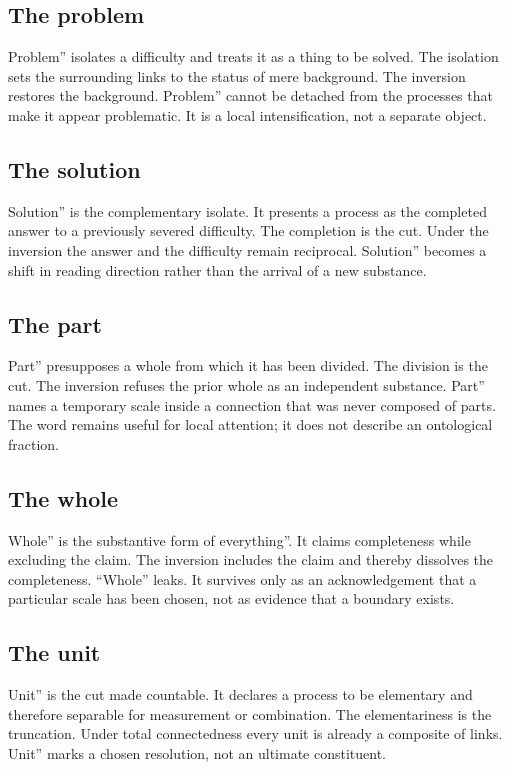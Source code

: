 \documentclass[11pt,a4paper]{article}
\begin{document}
\subsection{The problem} Problem'' isolates a difficulty and treats it as a thing to be solved. The isolation sets the surrounding links to the status of mere background. The inversion restores the background. Problem'' cannot be detached from the processes that make it appear problematic. It is a local intensification, not a separate object.

\subsection{The solution} Solution'' is the complementary isolate. It presents a process as the completed answer to a previously severed difficulty. The completion is the cut. Under the inversion the answer and the difficulty remain reciprocal. Solution'' becomes a shift in reading direction rather than the arrival of a new substance.

\subsection{The part} Part'' presupposes a whole from which it has been divided. The division is the cut. The inversion refuses the prior whole as an independent substance. Part'' names a temporary scale inside a connection that was never composed of parts. The word remains useful for local attention; it does not describe an ontological fraction.

\subsection{The whole} Whole'' is the substantive form of everything''. It claims completeness while excluding the claim. The inversion includes the claim and thereby dissolves the completeness. ``Whole'' leaks. It survives only as an acknowledgement that a particular scale has been chosen, not as evidence that a boundary exists.

\subsection{The unit} Unit'' is the cut made countable. It declares a process to be elementary and therefore separable for measurement or combination. The elementariness is the truncation. Under total connectedness every unit is already a composite of links. Unit'' marks a chosen resolution, not an ultimate constituent.
\end{document}
